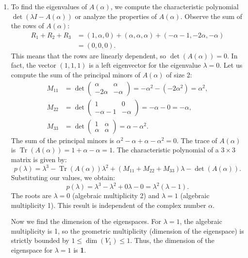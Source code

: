 \documentclass{article}
\begin{document}
\begin{enumerate}[label=\fbox{\arabic*}]
  \item %
        To find the eigenvalues of $A(\alpha)$, we compute the characteristic polynomial $\det(\lambda I - A(\alpha))$ or analyze the properties of $A(\alpha)$. 
        Observe the sum of the rows of $A(\alpha)$:
        \begin{align*}
          R_1 + R_2 + R_3 &= (1, \alpha, 0) + (\alpha, \alpha, \alpha) + (-\alpha - 1, -2\alpha, -\alpha) \\
          &= (0, 0, 0).
        \end{align*}
        This means that the rows are linearly dependent, so $\det(A(\alpha)) = 0$. In fact, the vector $(1, 1, 1)$ is a left eigenvector for the eigenvalue $\lambda = 0$. 
        Let us compute the sum of the principal minors of $A(\alpha)$ of size 2:
        \begin{align*}
          M_{11} &= \det \begin{pmatrix} \alpha & \alpha \\ -2\alpha & -\alpha \end{pmatrix} = -\alpha^2 - (-2\alpha^2) = \alpha^2, \\
          M_{22} &= \det \begin{pmatrix} 1 & 0 \\ -\alpha - 1 & -\alpha \end{pmatrix} = -\alpha - 0 = -\alpha, \\
          M_{33} &= \det \begin{pmatrix} 1 & \alpha \\ \alpha & \alpha \end{pmatrix} = \alpha - \alpha^2.
        \end{align*}
        The sum of the principal minors is $\alpha^2 - \alpha + \alpha - \alpha^2 = 0$. 
        The trace of $A(\alpha)$ is $\operatorname{Tr}(A(\alpha)) = 1 + \alpha - \alpha = 1$.
        The characteristic polynomial of a $3 \times 3$ matrix is given by:
        \[
          p(\lambda) = \lambda^3 - \operatorname{Tr}(A(\alpha)) \lambda^2 + (M_{11} + M_{22} + M_{33}) \lambda - \det(A(\alpha)).
        \]
        Substituting our values, we obtain:
        \[
          p(\lambda) = \lambda^3 - \lambda^2 + 0 \lambda - 0 = \lambda^2(\lambda - 1).
        \]
        The roots are $\lambda = 0$ (algebraic multiplicity 2) and $\lambda = 1$ (algebraic multiplicity 1). This result is independent of the complex number $\alpha$.
        
        Now we find the dimension of the eigenspaces. 
        For $\lambda = 1$, the algebraic multiplicity is 1, so the geometric multiplicity (dimension of the eigenspace) is strictly bounded by $1 \le \dim(V_1) \le 1$. Thus, the dimension of the eigenspace for $\lambda = 1$ is \textbf{1}.
        

\end{enumerate}
\end{document}
